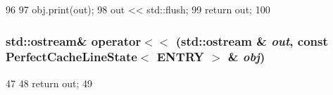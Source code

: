 \begin{DoxyCode}
96 {
97     obj.print(out);
98     out << std::flush;
99     return out;
100 }
\end{DoxyCode}
\hypertarget{PerfectCacheMemory_8hh_a63aca6cc5fb299399f4e932efbc959d4}{
\subsubsection[{operator$<$$<$}]{\setlength{\rightskip}{0pt plus 5cm}std::ostream\& operator$<$$<$ (std::ostream \& {\em out}, \/  const {\bf PerfectCacheLineState}$<$ ENTRY $>$ \& {\em obj})}}
\label{PerfectCacheMemory_8hh_a63aca6cc5fb299399f4e932efbc959d4}



\begin{DoxyCode}
47 {
48     return out;
49 }
\end{DoxyCode}
